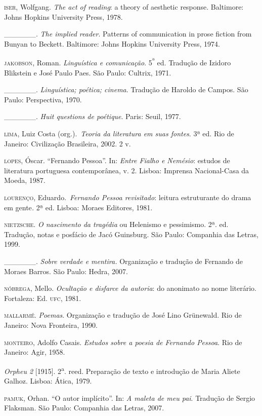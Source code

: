 \begin{Parskip}
\textsc{iser}, Wolfgang. \emph{The act of reading}: a theory of
aesthetic response. Baltimore: Johns Hopkins University Press, 1978.

\_\_\_\_\_\_. \emph{The implied reader}. Patterns of communication in
prose fiction from Bunyan to Beckett. Baltimore: Johns Hopkins
University Press, 1974.

\textsc{jakobson}, Roman. \emph{Linguística e comunicação}.
5\textsuperscript{ª} ed. Tradução de Izidoro Blikstein e José Paulo
Paes. São Paulo: Cultrix, 1971.

\textsc{\_\_\_\_\_\_.} \emph{Linguística; poética; cinema}. Tradução de
Haroldo de Campos. São Paulo: Perspectiva, 1970.

\_\_\_\_\_\_. \emph{Huit questions de poétique}. Paris: Seuil, 1977.

\textsc{lima}, Luiz Costa (org.).~\emph{Teoria da literatura em suas
fontes}. 3ª ed. Rio de Janeiro: Civilização Brasileira, 2002. 2 v.

\textsc{lopes}, Óscar. ``Fernando Pessoa''. In: \emph{Entre Fialho e
Nemésio}: estudos de literatura portuguesa contemporânea, v. 2. Lisboa:
Imprensa Nacional-Casa da Moeda, 1987.

\textsc{lourenço}, Eduardo.~\emph{Fernando Pessoa revisitado}: leitura
estruturante do drama em gente\emph{.} 2ª ed. Lisboa: Moraes Editores,
1981.

\textsc{nietzsche}. \emph{O nascimento da tragédia} ou Helenismo e
pessimismo. 2ª. ed. Tradução, notas e posfácio de Jacó Guinsburg. São
Paulo: Companhia das Letras, 1999.

\_\_\_\_\_\_. \emph{Sobre verdade e mentira.} Organização e tradução de
Fernando de Moraes Barros. São Paulo: Hedra, 2007.

\textsc{nóbrega}, Mello. \emph{Ocultação e disfarce da autoria}: do
anonimato ao nome literário. Fortaleza: Ed. \textsc{ufc}, 1981.

\textsc{mallarmé}. \emph{Poemas}. Organização e tradução de José Lino
Grünewald. Rio de Janeiro: Nova Fronteira, 1990.

\textsc{monteiro}, Adolfo Casais. \emph{Estudos sobre a poesia de
Fernando Pessoa}. Rio de Janeiro: Agir, 1958.

\emph{Orpheu 2} {[}1915{]}. 2\textsuperscript{a}. reed. Preparação de
texto e introdução de Maria Aliete Galhoz. Lisboa: Ática, 1979.

\textsc{pamuk}, Orhan. ``O autor implícito''. In: \emph{A maleta de meu
pai}. Tradução de Sergio Flaksman. São Paulo: Companhia das Letras,
2007.


\end{Parskip}
